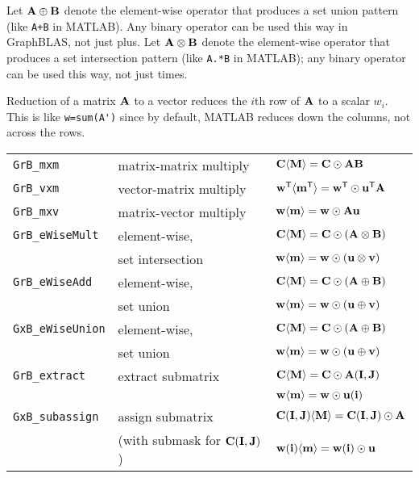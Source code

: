 \documentclass[12pt]{article}
\begin{document}
Let ${\bf A \oplus B}$ denote the element-wise operator that produces a set
union pattern (like \verb'A+B' in MATLAB).  Any binary operator can be used
this way in GraphBLAS, not just plus.  Let ${\bf A \otimes B}$ denote the
element-wise operator that produces a set intersection pattern (like
\verb'A.*B' in MATLAB); any binary operator can be used this way, not just
times.

Reduction of a matrix ${\bf A}$ to a vector reduces the $i$th row of ${\bf A}$
to a scalar $w_i$.  This is like \verb"w=sum(A')" since by default, MATLAB
reduces down the columns, not across the rows.

\vspace{0.05in}
{\footnotesize
\begin{tabular}{lll}
\hline
\verb'GrB_mxm'       & matrix-matrix multiply  & ${\bf C \langle M \rangle = C \odot AB}$ \\
\verb'GrB_vxm'       & vector-matrix multiply  & ${\bf w^{\sf T}\langle m^{\sf T}\rangle = w^{\sf T}\odot u^{\sf T}A}$ \\
\verb'GrB_mxv'       & matrix-vector multiply  & ${\bf w \langle m \rangle = w \odot Au}$ \\
\hline
\verb'GrB_eWiseMult' & element-wise,           & ${\bf C \langle M \rangle = C \odot (A \otimes B)}$ \\
                     & set intersection        & ${\bf w \langle m \rangle = w \odot (u \otimes v)}$ \\
\hline
\verb'GrB_eWiseAdd'  & element-wise,           & ${\bf C \langle M \rangle = C \odot (A \oplus  B)}$ \\
                     & set union               & ${\bf w \langle m \rangle = w \odot (u \oplus  v)}$ \\
\hline
\verb'GxB_eWiseUnion'& element-wise,           & ${\bf C \langle M \rangle = C \odot (A \oplus  B)}$ \\
                     & set union               & ${\bf w \langle m \rangle = w \odot (u \oplus  v)}$ \\
\hline
\verb'GrB_extract'   & extract submatrix       & ${\bf C \langle M \rangle = C \odot A(I,J)}$ \\
                     &                         & ${\bf w \langle m \rangle = w \odot u(i)}$ \\
\hline
\verb'GxB_subassign' & assign submatrix        & ${\bf C (I,J) \langle M \rangle = C(I,J) \odot A}$ \\
                     & (with submask for ${\bf C(I,J)}$)
                                               & ${\bf w (i)   \langle m \rangle = w(i)   \odot u}$ \\

\end{tabular}}
\end{document}
